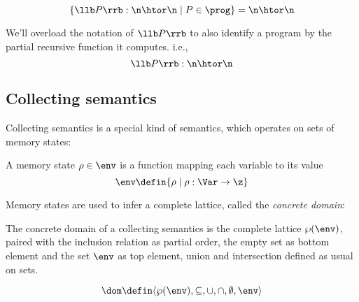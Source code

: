 \begin{observation}
  \[\{\llb P \rrb : \n \htor \n \mid P \in \prog\} = \n \htor \n\]
\end{observation}

\begin{notation}[I/O semantics]
  We'll overload the notation of \(\llb P\rrb\) to also identify a
  program by the partial recursive function it computes. i.e., \[\llb
  P \rrb : \n \htor \n\]
\end{notation}





\subsection{Collecting semantics}


Collecting semantics is a special kind of semantics, which operates on
sets of memory states:

\begin{definition}\label{def:states}
  A memory state \(\rho \in \env\) is a function mapping each variable
  to its value \[\env \defin \{\rho \mid \rho : \Var \to \z\}\]
\end{definition}

Memory states are used to infer a complete lattice, called the
\emph{concrete domain}:

\begin{definition}\label{def:concrete}
  The concrete domain of a collecting semantics is the complete
  lattice \(\wp(\env)\), paired with the inclusion relation as partial
  order, the empty set as bottom element and the set \(\env\) as top
  element, union and intersection defined as usual on sets.

  \[\dom \defin \langle \wp(\env), \subseteq, \cup, \cap,
  \emptyset, \env \rangle\]
\end{definition}

